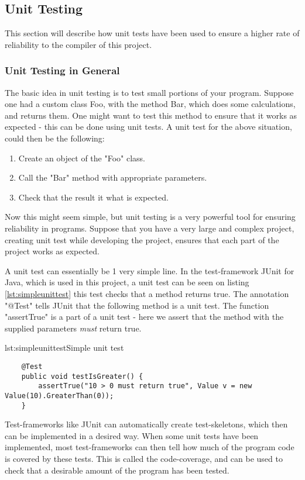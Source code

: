 \subsection{Unit Testing}
This section will describe how unit tests have been used to ensure a higher rate of reliability to the compiler of this project. 

\subsubsection{Unit Testing in General}
The basic idea in unit testing is to test small portions of your program. Suppose one had a custom class Foo, with the method Bar, which does some calculations, and returns them. One might want to test this method to ensure that it works as expected - this can be done using unit tests. A unit test for the above situation, could then be the following:
\begin{enumerate}
	\item Create an object of the "Foo" class.
	\item Call the "Bar" method with appropriate parameters. 
	\item Check that the result it what is expected.
\end{enumerate}
Now this might seem simple, but unit testing is a very powerful tool for ensuring reliability in programs. Suppose that you have a very large and complex project, creating unit test while developing the project, ensures that each part of the project works as expected.

A unit test can essentially be 1 very simple line. In the test-framework JUnit for Java, which is used in this project, a unit test can be seen on listing \ref{lst:simpleunittest} this test checks that a method returns true. The annotation "@Test" tells JUnit that the following method is a unit test. The function "assertTrue" is a part of a unit test - here we assert that the method with the supplied parameters \emph{must} return true.

\begin{code}{lst:simpleunittest}{Simple unit test}
\begin{lstlisting}
	@Test
	public void testIsGreater() {
	    assertTrue("10 > 0 must return true", Value v = new Value(10).GreaterThan(0));
	}
\end{lstlisting}
\end{code}

Test-frameworks like JUnit can automatically create test-skeletons, which then can be implemented in a desired way. When some unit tests have been implemented, most test-frameworks can then tell how much of the program code is covered by these tests. This is called the code-coverage, and can be used to check that a desirable amount of the program has been tested.

